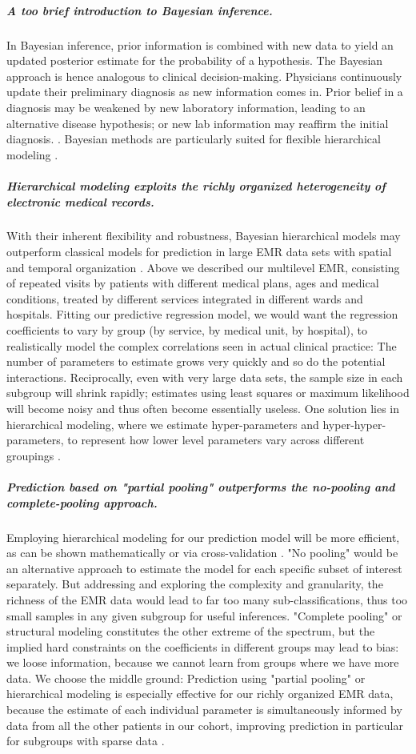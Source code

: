 \documentclass[11pt,notitlepage]{article}
\begin{document}
\subparagraph*{A too brief introduction to Bayesian inference.}
In Bayesian inference, prior information is combined with new data to yield an updated posterior estimate for the probability of a hypothesis. The Bayesian approach is hence analogous to clinical decision-making. Physicians continuously update their preliminary diagnosis as new information comes in. Prior belief in a diagnosis may be weakened by new laboratory information, leading to an alternative disease hypothesis; or new lab information may reaffirm the initial diagnosis. \cite{Kruschke_22774788}. Bayesian methods are particularly suited for flexible hierarchical modeling \cite{Carlin_1349763,Sutton_2012}.

\subparagraph{Hierarchical modeling exploits the richly organized heterogeneity of electronic medical records.}
With their inherent flexibility and robustness, Bayesian hierarchical models may outperform classical models for prediction in large EMR data sets with spatial and temporal organization \cite{Gelman_red_2009}. Above we described our multilevel EMR, consisting of repeated visits by patients with different medical plans, ages and medical conditions, treated by different services integrated in different wards and hospitals. Fitting our predictive regression model, we would want the regression coefficients to vary by group (by service, by medical unit, by hospital), to realistically model the complex correlations seen in actual clinical practice: The number of parameters to estimate grows very quickly and so do the potential interactions. Reciprocally, even with very large data sets, the sample size in each subgroup will shrink rapidly; estimates using least squares or maximum likelihood will become noisy and thus often become essentially useless. One solution lies in hierarchical modeling, where we estimate hyper-parameters and hyper-hyper-parameters, to represent how lower level parameters vary across different groupings \cite{Bafumi_Gelman_2007}.

\subparagraph*{Prediction based on "partial pooling" outperforms the no-pooling and complete-pooling approach.}
Employing hierarchical modeling for our prediction model will be more efficient, as can be shown mathematically or via cross-validation \cite{Gelman-Hill_2014}. "No pooling" would be an alternative approach to estimate the model for each specific subset of interest separately. But addressing and exploring the complexity and granularity, the richness of the EMR data would lead to far too many sub-classifications, thus too small samples in any given subgroup for useful inferences. "Complete pooling" or structural modeling constitutes the other extreme of the spectrum, but the implied hard constraints on the coefficients in different groups may lead to bias: we loose information, because we cannot learn from groups where we have more data. We choose the middle ground: Prediction using "partial pooling" or hierarchical modeling is especially effective for our richly organized EMR data, because the estimate of each individual parameter is simultaneously informed by data from all the other patients in our cohort, improving prediction in particular for subgroups with sparse data \cite{Gelman_multilevel_2006}. \newline
\end{document}
